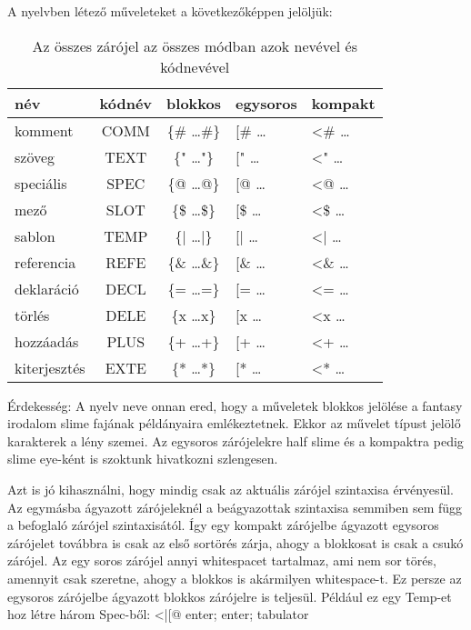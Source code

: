 {A nyelvben létező műveleteket a következőképpen jelöljük:
\begin{table}
\begin{center}
  \begin{tabular}{ | l | c | c | l | l | }
    \hline
    név		& kódnév 	& blokkos 		& egysoros 	& kompakt	\\ \hline
    komment		& COMM 		& \{\# …\#\} 	& [\# … 	& <\# … 	\\ \hline
    szöveg 		& TEXT 		& \{" …"\} 		& [" … 		& <" … 		\\ \hline
    speciális	& SPEC 		& \{@ …@\} 		& [@ … 		& <@ … 		\\ \hline
    mező 		& SLOT 		& \{\$ …\$\} 	& [\$ … 	& <\$ … 	\\ \hline
    sablon 		& TEMP 		& \{| …|\} 		& [| … 		& <| … 		\\ \hline
    referencia	& REFE 		& \{\& …\&\} 	& [\& … 	& <\& … 	\\ \hline 
    deklaráció 	& DECL 		& \{= …=\} 		& [= … 		& <= … 		\\ \hline
    törlés 		& DELE 		& \{x …x\} 		& [x … 		& <x … 		\\ \hline
    hozzáadás	& PLUS 		& \{+ …+\} 		& [+ … 		& <+ … 		\\ \hline
    kiterjesztés& EXTE 		& \{* …*\} 		& [* … 		& <* … 		\\
    \hline
  \end{tabular} 
\end{center}
\label{table:brackets}
\caption{Az összes zárójel az összes módban azok nevével és kódnevével}
\end{table}
	 	 	
Érdekesség:
A nyelv neve onnan ered, hogy a műveletek blokkos jelölése a fantasy irodalom slime fajának példányaira emlékeztetnek.
Ekkor az művelet típust jelölő karakterek a lény szemei. 
Az egysoros zárójelekre half slime és a kompaktra pedig slime eye-ként is szoktunk hivatkozni szlengesen.

Azt is jó kihasználni, hogy mindig csak az aktuális zárójel szintaxisa érvényesül.
Az egymásba ágyazott zárójeleknél a beágyazottak szintaxisa semmiben sem függ a befoglaló zárójel szintaxisától. 
Így egy kompakt zárójelbe ágyazott egysoros zárójelet továbbra is csak az első sortörés zárja, ahogy a blokkosat is csak a csukó zárójel. 
Az egy soros zárójel annyi whitespacet tartalmaz, ami nem sor törés, amennyit csak szeretne, ahogy a blokkos is akármilyen whitespace-t. 
Ez persze az egysoros zárójelbe ágyazott blokkos zárójelre is teljesül. 
Például ez egy Temp-et hoz létre három Spec-ből: <|[@ enter; enter; tabulator

}

